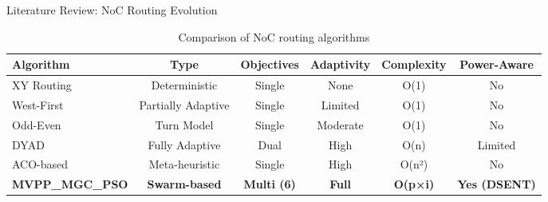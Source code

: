 \documentclass[10pt,aspectratio=169]{beamer}
\begin{document}
\begin{frame}{Literature Review: NoC Routing Evolution}
    \begin{table}[h]
        \centering
        \footnotesize
        \begin{tabular}{|l|c|c|c|c|c|}
            \hline
            \textbf{Algorithm} & \textbf{Type} & \textbf{Objectives} & \textbf{Adaptivity} & \textbf{Complexity} & \textbf{Power-Aware} \\
            \hline
            XY Routing & Deterministic & Single & None & O(1) & No \\
            West-First & Partially Adaptive & Single & Limited & O(1) & No \\
            Odd-Even & Turn Model & Single & Moderate & O(1) & No \\
            DYAD & Fully Adaptive & Dual & High & O(n) & Limited \\
            ACO-based & Meta-heuristic & Single & High & O(n²) & No \\
            \hline
            \textbf{MVPP\_MGC\_PSO} & \textbf{Swarm-based} & \textbf{Multi (6)} & \textbf{Full} & \textbf{O(p×i)} & \textbf{Yes (DSENT)} \\
            \hline
        \end{tabular}
        \caption{Comparison of NoC routing algorithms}
    \end{table}
\end{frame}
\end{document}
